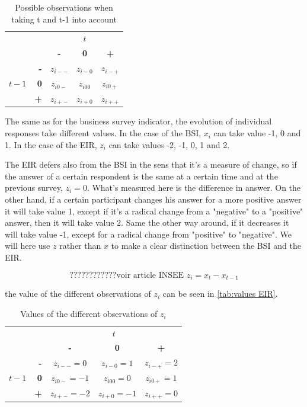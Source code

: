 \documentclass[12pt,a4paper,oneside]{book}
\begin{document}
\begin{table}[htp!]
    \centering
    \begin{tabular}{r | r | c c c | }
    \multicolumn{1}{r}{} & \multicolumn{1}{r}{} &	\multicolumn{3}{c}{$t$} \\ \cline{3-5}
    \multicolumn{1}{r}{} & 		& \textbf{-} & \textbf{0} & \textbf{+} \\ \cline{2-5}
    		&    \textbf{-} & $z_{i--}$	& $z_{i-0}$	& $z_{i-+}$ \\ 
    $t-1$ & \textbf{0} & $z_{i0-}$	& $z_{i00}$	& $z_{i0+}$	\\
    		&    \textbf{+} & $z_{i+-}$	& $z_{i+0}$	& $z_{i++}$ \\ \cline{2-5}
    \end{tabular}
    \caption{Possible observations when taking t and t-1 into account}
    \label{tab:EIR explanation}
\end{table}{}

The same as for the business survey indicator, the evolution of individual responses take different values. In the case of the BSI, $x_i$ can take value -1, 0 and 1. In the case of the EIR, $z_i$ can take values -2, -1, 0, 1 and 2.

The EIR defers also from the BSI in the sens that it's a measure of change, so if the answer of a certain respondent is the same at a certain time and at the previous survey, $z_i=0$. What's measured here is the difference in answer.
On the other hand, if a certain participant changes his answer for a more positive answer it will take value 1, except if it's a radical change from a "negative" to a "positive" answer, then it will take value 2.
Same the other way around, if it decreases it will take value -1, except for a radical change from "positive" to "negative".
We will here use $z$ rather than $x$ to make a clear distinction between the BSI and the EIR.

\begin{equation}
	????????????\text{voir article INSEE   }  z_i = x_{t} - x_{t-1}
\end{equation}

the value of the different observations of $z_i$ can be seen in \autoref{tab:values EIR}. 

\begin{table}[H]
    \centering
    \begin{tabular}{r | r | c c c | }
    \multicolumn{1}{r}{} & \multicolumn{1}{r}{} &	\multicolumn{3}{c}{$t$} \\ \cline{3-5}
    \multicolumn{1}{r}{} & 		& \textbf{-} & \textbf{0} & \textbf{+} \\ \cline{2-5}
   		&    \textbf{-} & $z_{i--}=0$	& $z_{i-0}=1$	& $z_{i-+}=2$ \\ 
    $t-1$ & \textbf{0}  & $z_{i0-}=-1$	& $z_{i00}=0$	& $z_{i0+}=1$	\\
    		& \textbf{+}& $z_{i+-}=-2$	& $z_{i+0}=-1$	& $z_{i++}=0$ \\ \cline{2-5}
\end{tabular}
    \caption{Values of the different observations of $z_i$}
    \label{tab:values EIR}
\end{table}{}
\end{document}
